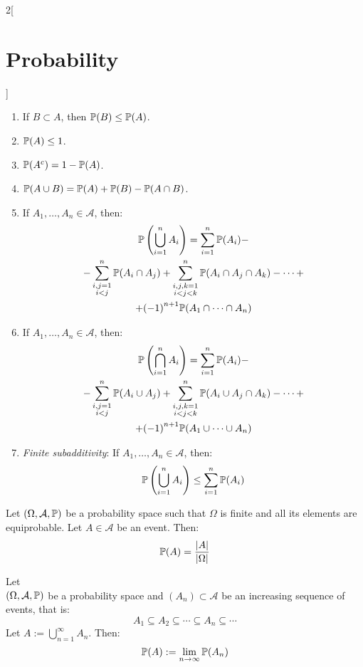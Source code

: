 \documentclass[../../../main.tex]{subfiles}
\begin{document}
\begin{multicols}{2}[\section{Probability}]
\begin{prop}
\begin{enumerate}
            \item If $B\subset A$, then $\mathbb{P}(B)\leq \mathbb{P}(A)$.
            \item $\mathbb{P}(A)\leq 1$.
            \item $\mathbb{P}(A^c)=1-\mathbb{P}(A)$.
            \item $\mathbb{P}(A\cup B) =\mathbb{P}(A)+\mathbb{P}(B)-\mathbb{P}(A\cap B)$.
            \item If $A_1,\ldots,A_n\in\mathcal{A}$, then:
                  \begin{multline*}
                      \mathbb{P}\left(\bigcup_{i=1}^n A_i\right)=\sum_{i=1}^n \mathbb{P}(A_i)-\\-\sum_{\substack{i,j=1\\i<j}}^n\mathbb{P}(A_i\cap A_j)+\sum_{\substack{i,j,k=1\\i<j<k}}^n\mathbb{P}(A_i\cap A_j\cap A_k)-\cdots+\\+{(-1)}^{n+1}\mathbb{P}(A_1\cap\cdots\cap A_n)
                  \end{multline*}
            \item If $A_1,\ldots,A_n\in\mathcal{A}$, then:
                  \begin{multline*}
                      \mathbb{P}\left(\bigcap_{i=1}^n A_i\right)=\sum_{i=1}^n \mathbb{P}(A_i)-\\-\sum_{\substack{i,j=1\\i<j}}^n\mathbb{P}(A_i\cup A_j)+\sum_{\substack{i,j,k=1\\i<j<k}}^n\mathbb{P}(A_i\cup A_j\cap A_k)-\cdots+\\+{(-1)}^{n+1}\mathbb{P}(A_1\cup\cdots\cup A_n)
                  \end{multline*}
            \item \textit{Finite subadditivity}: If $A_1,\ldots,A_n\in\mathcal{A}$, then: $$\mathbb{P}\left(\bigcup_{i=1}^n A_i\right)\leq\sum_{i=1}^n \mathbb{P}(A_i)$$
        \end{enumerate}
    \end{prop}
    \begin{prop}
        Let $(\Omega,\mathcal{A},\mathbb{P})$ be a probability space such that $\Omega$ is finite and all its elements are equiprobable. Let $A\in\mathcal{A}$ be an event. Then: $$\mathbb{P}(A)=\frac{|A|}{|\Omega|}$$
    \end{prop}
    \begin{theorem}
        Let\\ $(\Omega,\mathcal{A},\mathbb{P})$ be a probability space and $(A_n)\subset\mathcal{A}$ be an increasing sequence of events, that is: $$A_1\subseteq A_2\subseteq\cdots\subseteq A_n\subseteq\cdots$$ Let $A:=\bigcup_{n=1}^\infty A_n$. Then: $$\mathbb{P}(A):=\lim_{n\to\infty}\mathbb{P}(A_n)$$

\end{theorem}
\end{multicols}
\end{document}
